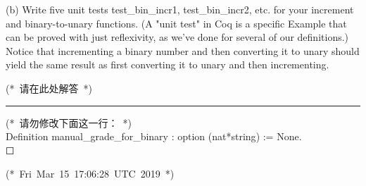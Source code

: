 \documentclass[utf8]{ctexart}
\begin{document}
(b) Write five unit tests {{test\_bin\_incr1}}, {{test\_bin\_incr2}},
etc. for your increment and binary-to-unary functions. (A "unit test" in
Coq is a specific {{Example}} that can be proved with just
{{reflexivity}}, as we've done for several of our definitions.) Notice
that incrementing a binary number and then converting it to unary should
yield the same result as first converting it to unary and then
incrementing.

{(*~请在此处解答~*)}\\

\begin{center}\rule{0.5\linewidth}{\linethickness}\end{center}

{(*~请勿修改下面这一行：~*)}\\
{Definition} {manual\_grade\_for\_binary} : {option} ({nat}*{string}) :=
{None}.\\

{☐}

{(*~Fri~Mar~15~17:06:28~UTC~2019~*)}\\
\end{document}
